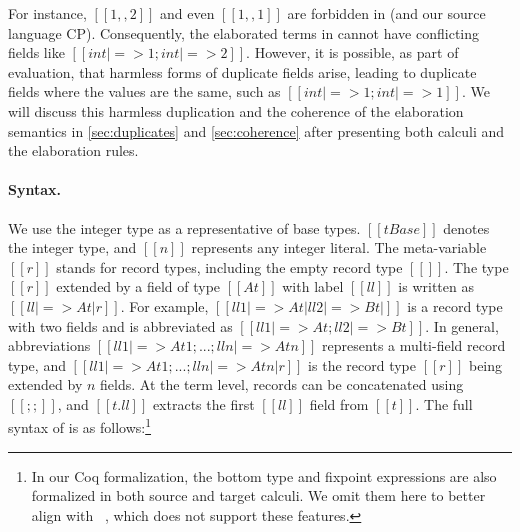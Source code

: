 For instance, $[[1,,2]]$ and even $[[1,,1]]$ are forbidden in \lambdaiplus (and
our source language CP). Consequently, the elaborated terms in \lambdar cannot
have conflicting fields like $[[{int|=>1;int|=>2}]]$. However, it is possible,
as part of evaluation, that harmless forms of duplicate fields arise, leading to
duplicate fields where the values are the same, such as $[[{int|=>1;int|=>1}]]$.
We will discuss this harmless duplication and the coherence of the elaboration
semantics in \autoref{sec:duplicates} and \autoref{sec:coherence} after
presenting both calculi and the elaboration rules.

\paragraph{Syntax.}
We use the integer type as a representative of base types. $[[tBase]]$ denotes
the integer type, and $[[n]]$ represents any integer literal. The meta-variable
$[[r]]$ stands for record types, including the empty record type $[[{}]]$. The
type $[[r]]$ extended by a field of type $[[At]]$ with label $[[ll]]$ is written
as $[[{ll |=>At | r}]]$. For example, $[[{ll1 |=>At | {ll2|=>Bt | {}}}]]$ is a
record type with two fields and is abbreviated as $[[ {ll1 |=>At; ll2|=>Bt} ]]$.
In general, abbreviations $[[ { ll1 |=>At1 ; ... ; lln |=>Atn } ]]$ represents a
multi-field record type, and $[[ { ll1 |=> At1 ; ... ; lln |=> Atn | r } ]]$ is
the record type $[[r]]$ being extended by $n$ fields. At the term level, records
can be concatenated using $[[;;]]$, and $[[t.ll ]]$ extracts the first $[[ll]]$
field from $[[t]]$. The full syntax of \lambdar is as follows:\footnote{In our
Coq formalization, the bottom type and fixpoint expressions are also formalized
in both source and target calculi. We omit them here to better align with
\lambdaiplus~\citep{bi2018essence}, which does not support these features.}
